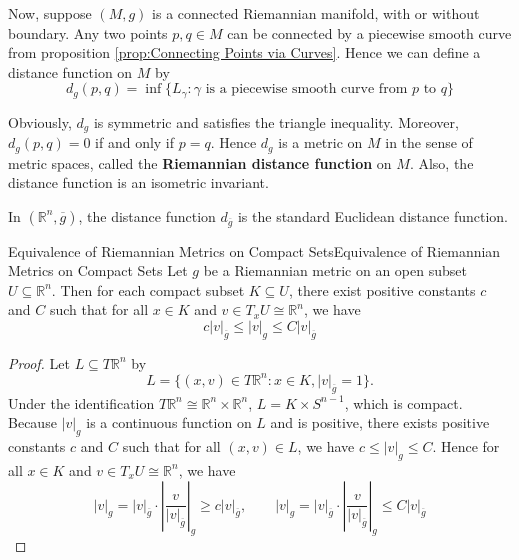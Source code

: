 \documentclass[../main.tex]{subfiles}
\begin{document}
Now, suppose $(M,g)$ is a connected Riemannian manifold, with or without boundary. Any two points $p,q\in M$ can be connected by a piecewise smooth curve from proposition \ref{prop:Connecting Points via Curves}. Hence we can define a distance function on $M$ by
\begin{equation}
  d_g(p,q) = \inf \{L_\gamma: \gamma \text{ is a piecewise smooth curve from } p \text{ to } q\}
\end{equation}

Obviously, $d_g$ is symmetric and satisfies the triangle inequality. Moreover, $d_g(p,q) = 0$ if and only if $p=q$. Hence $d_g$ is a metric on $M$ in the sense of metric spaces, called the \textbf{Riemannian distance function} on $M$. Also, the distance function is an isometric invariant.

In $(\mathbb{R}^n, \overline{g})$, the distance function $d_{\overline{g}}$ is the standard Euclidean distance function.

\begin{lemma}{Equivalence of Riemannian Metrics on Compact Sets}{Equivalence of Riemannian Metrics on Compact Sets}
  Let $g$ be a Riemannian metric on an open subset $U\subseteq \mathbb{R}^n$. Then for each compact subset $K\subseteq U$, there exist positive constants $c$ and $C$ such that for all $x\in K$ and $v\in T_xU\cong \mathbb{R}^n$, we have
  \begin{equation}
    c|v|_{\overline{g}} \leq |v|_g \leq C|v|_{\overline{g}}
  \end{equation}
\end{lemma}
\begin{proof}
  Let $L \subseteq T \mathbb{R}^n$ by
  \begin{equation*}
    L = \{(x,v)\in T\mathbb{R}^n: x\in K, |v|_{\overline{g}} = 1\}.
  \end{equation*}
  Under the identification $T\mathbb{R}^n \cong \mathbb{R}^n \times \mathbb{R}^n$, $L = K \times S^{n-1}$, which is compact. Because $|v|_g$ is a continuous function on $L$ and is positive, there exists positive constants $c$ and $C$ such that for all $(x,v)\in L$, we have $c \leq |v|_g \leq C$. Hence for all $x\in K$ and $v\in T_xU\cong \mathbb{R}^n$, we have
  \begin{equation*}
    |v|_g = |v|_{\overline{g}} \cdot\left|\frac{v}{|v|_{\overline{g}}}\right|_g \geq c|v|_{\overline{g}}, \qquad |v|_g = |v|_{\overline{g}} \cdot\left|\frac{v}{|v|_{\overline{g}}}\right|_g \leq C|v|_{\overline{g}}
  \end{equation*}
\end{proof}
\end{document}
